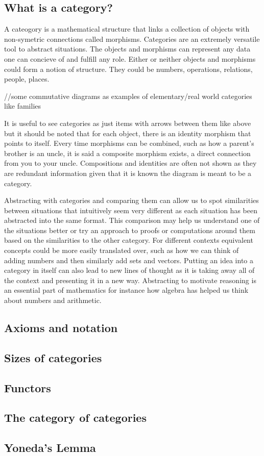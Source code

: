 \documentclass{amsart}
\begin{document}
\subsection{What is a category?}
A cateogory is a mathematical structure that links
a collection of objects with non-symetric connections called morphisms.
Categories are an extremely versatile tool to abstract situations.
The objects and morphisms can represent any data one can concieve of and fulfill any role.
Either or neither objects and morphisms could form a notion of structure.
They could be numbers, operations, relations, people, places.

//some commutative diagrams as examples of elementary/real world categories like families

It is useful to see categories as just items with arrows between them like above but it should be noted that for each object, there is an identity morphism that points to itself.
Every time morphisms can be combined, such as how a parent's brother is an uncle, it is said a composite morphism exists, a direct connection from you to your uncle.
Compositions and identities are often not shown as they are redundant information given that it is known the diagram is meant to be a category.

Abstracting with categories and comparing them can allow us to spot similarities between situations that intuitively seem very different as each situation has been abstracted into the same format.
This comparison may help us understand one of the situations better or try an approach to proofs or computations around them based on the similarities to the other category.
For different contexts equivalent concepts could be more easily translated over, such as how we can think of adding numbers and then similarly add sets and vectors. 
Putting an idea into a category in itself can also lead to new lines of thought as it is taking away all of the context and presenting it in a new way.
Abstracting to motivate reasoning is an essential part of mathematics for instance how algebra has helped us think about numbers and arithmetic.

\subsection{Axioms and notation}
\subsection{Sizes of categories}
\subsection{Functors}
\subsection{The category of categories}
\subsection{Yoneda's Lemma}
\end{document}
